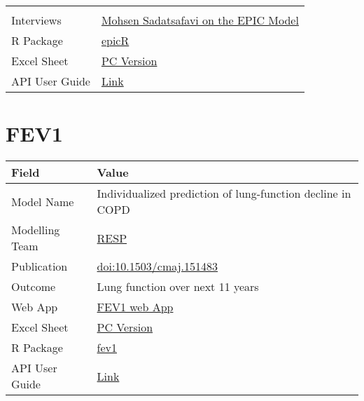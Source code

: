 \documentclass[
]{book}
\begin{document}
\begin{longtable}[]{@{}ll@{}}
\begin{minipage}[t]{0.49\columnwidth}
\end{minipage}\tabularnewline
\begin{minipage}[t]{0.45\columnwidth}\raggedright
Interviews\strut
\end{minipage} & \begin{minipage}[t]{0.49\columnwidth}\raggedright
\href{https://www.peermodelsnetwork.com/post/interview-with-mohsen-sadatsafavi}{Mohsen Sadatsafavi on the EPIC Model}\strut
\end{minipage}\tabularnewline
\begin{minipage}[t]{0.45\columnwidth}\raggedright
R Package\strut
\end{minipage} & \begin{minipage}[t]{0.49\columnwidth}\raggedright
\href{https://github.com/resplab/epicR}{epicR}\strut
\end{minipage}\tabularnewline
\begin{minipage}[t]{0.45\columnwidth}\raggedright
Excel Sheet\strut
\end{minipage} & \begin{minipage}[t]{0.49\columnwidth}\raggedright
\href{https://drive.google.com/uc?export=download\&id=15yY_O7wVgoEbaHNLDBjfN2PqnenB6WWa}{PC Version}\strut
\end{minipage}\tabularnewline
\begin{minipage}[t]{0.45\columnwidth}\raggedright
API User Guide\strut
\end{minipage} & \begin{minipage}[t]{0.49\columnwidth}\raggedright
\href{https://resplab.github.io/prismguide/api-users-guide.html\#epic-1}{Link}\strut
\end{minipage}\tabularnewline
\bottomrule
\end{longtable}

\hypertarget{fev1}{%
\chapter{FEV1}\label{fev1}}

\begin{longtable}[]{@{}ll@{}}
\toprule
Field & Value\tabularnewline
\midrule
\endhead
Model Name & Individualized prediction of lung-function decline in COPD\tabularnewline
Modelling Team & \href{http://resp.core.ubc.ca}{RESP}\tabularnewline
Publication & \href{https://doi.org/10.1503/cmaj.151483}{doi:10.1503/cmaj.151483}\tabularnewline
Outcome & Lung function over next 11 years\tabularnewline
Web App & \href{http://resp.core.ubc.ca/ipress/FEV1Pred}{FEV1 web App}\tabularnewline
Excel Sheet & \href{https://drive.google.com/uc?export=download\&id=1--OGtwrKHuQeUqaYMQ3CISvnTODQbF_I}{PC Version}\tabularnewline
R Package & \href{https://github.com/resplab/fev1}{fev1}\tabularnewline
API User Guide & \href{https://resplab.github.io/prismguide/api-users-guide.html\#fev1-1}{Link}\tabularnewline
\bottomrule
\end{longtable}
\end{document}

